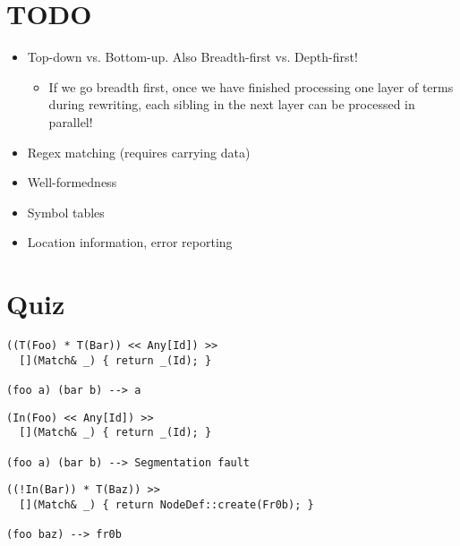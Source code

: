\documentclass{article}
\begin{document}
\section*{TODO}

\begin{itemize}
\item Top-down vs. Bottom-up. Also Breadth-first vs. Depth-first!
  \begin{itemize}
  \item If we go breadth first, once we have finished processing
    one layer of terms during rewriting, each sibling in the next
    layer can be processed in parallel!
  \end{itemize}
\item Regex matching (requires carrying data)
\item Well-formedness
\item Symbol tables
\item Location information, error reporting
\end{itemize}

\section*{Quiz}

\begin{verbatim}
((T(Foo) * T(Bar)) << Any[Id]) >>
  [](Match& _) { return _(Id); }

(foo a) (bar b) --> a
\end{verbatim}

\begin{verbatim}
(In(Foo) << Any[Id]) >>
  [](Match& _) { return _(Id); }

(foo a) (bar b) --> Segmentation fault
\end{verbatim}

\begin{verbatim}
((!In(Bar)) * T(Baz)) >>
  [](Match& _) { return NodeDef::create(Fr0b); }

(foo baz) --> fr0b
\end{verbatim}
\end{document}
